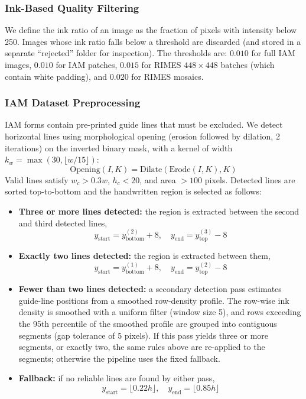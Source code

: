 \begin{appendices}
\subsubsection{Ink-Based Quality Filtering}
\label{app:ink-ratio-filter}

We define the ink ratio of an image as the fraction of pixels with intensity below 250.
Images whose ink ratio falls below a threshold are discarded (and stored in a separate
``rejected'' folder for inspection). The thresholds are: $0.010$ for full IAM images,
$0.010$ for IAM patches, $0.015$ for RIMES $448\times448$ batches (which contain white
padding), and $0.020$ for RIMES mosaics.

\subsubsection{IAM Dataset Preprocessing}

IAM forms contain pre-printed guide lines that must be excluded. We detect horizontal lines
using morphological opening (erosion followed by dilation, 2 iterations) on the inverted binary
mask, with a kernel of width $k_w = \max(30, \lfloor w/15 \rfloor)$:
\begin{equation}
\text{Opening}(I, K) = \text{Dilate}(\text{Erode}(I, K), K)
\end{equation}
Valid lines satisfy $w_c > 0.3w$, $h_c < 20$, and area $> 100$ pixels. Detected lines are
sorted top-to-bottom and the handwritten region is selected as follows:

\begin{itemize}
\item \textbf{Three or more lines detected:} the region is extracted between the second and
third detected lines,
\begin{equation}
y_{\text{start}} = y_{\text{bottom}}^{(2)} + 8, \quad y_{\text{end}} = y_{\text{top}}^{(3)} - 8
\end{equation}
\item \textbf{Exactly two lines detected:} the region is extracted between them,
\begin{equation}
y_{\text{start}} = y_{\text{bottom}}^{(1)} + 8, \quad y_{\text{end}} = y_{\text{top}}^{(2)} - 8
\end{equation}
\item \textbf{Fewer than two lines detected:} a secondary detection pass estimates guide-line
positions from a smoothed row-density profile. The row-wise ink density is smoothed with a
uniform filter (window size 5), and rows exceeding the 95th percentile of the smoothed profile
are grouped into contiguous segments (gap tolerance of 5 pixels). If this pass yields three or
more segments, or exactly two, the same rules above are re-applied to the segments; otherwise
the pipeline uses the fixed fallback.
\item \textbf{Fallback:} if no reliable lines are found by either pass,
\begin{equation}
y_{\text{start}} = \lfloor 0.22h \rfloor, \quad y_{\text{end}} = \lfloor 0.85h \rfloor
\end{equation}
\end{itemize}


\end{appendices}
